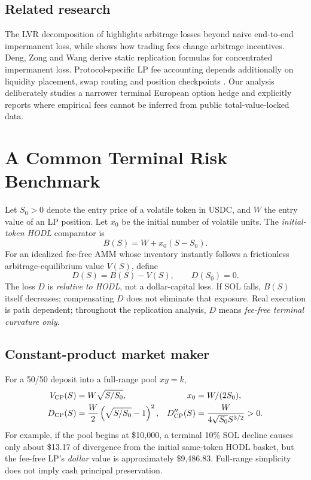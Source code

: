 \subsection{Related research}
The LVR decomposition of \cite{milionis2022lvr} highlights arbitrage losses beyond naive end-to-end impermanent loss, while \cite{milionis2023fees} shows how trading fees change arbitrage incentives. Deng, Zong and Wang \cite{deng2023static} derive static replication formulas for concentrated impermanent loss. Protocol-specific LP fee accounting depends additionally on liquidity placement, swap routing and position checkpoints \cite{univ3,meteoraaccounts}. Our analysis deliberately studies a narrower terminal European option hedge and explicitly reports where empirical fees cannot be inferred from public total-value-locked data.

\section{A Common Terminal Risk Benchmark}
Let $S_0>0$ denote the entry price of a volatile token in USDC, and $W$ the entry value of an LP position. Let $x_0$ be the initial number of volatile units. The \emph{initial-token HODL} comparator is
\begin{equation}
B(S)=W+x_0(S-S_0).
\label{eq:hodl}
\end{equation}
For an idealized fee-free AMM whose inventory instantly follows a frictionless arbitrage-equilibrium value $V(S)$, define
\begin{equation}
 D(S)=B(S)-V(S),\qquad D(S_0)=0.
 \label{eq:divergence}
\end{equation}
The loss $D$ is \emph{relative to HODL}, not a dollar-capital loss. If SOL falls, $B(S)$ itself decreases; compensating $D$ does not eliminate that exposure. Real execution is path dependent; throughout the replication analysis, $D$ means \emph{fee-free terminal curvature only}.

\subsection{Constant-product market maker}
For a 50/50 deposit into a full-range pool $xy=k$,
\begin{align}
V_{\mathrm{CP}}(S)&=W\sqrt{S/S_0},&
x_0&=W/(2S_0),\label{eq:cp-value}\\
D_{\mathrm{CP}}(S)&=\frac{W}{2}\left(\sqrt{S/S_0}-1\right)^2,&
D_{\mathrm{CP}}''(S)&=\frac{W}{4\sqrt{S_0}S^{3/2}}>0.
\label{eq:cp-loss}
\end{align}
For example, if the pool begins at \$10,000, a terminal 10\% SOL decline causes only about \$13.17 of divergence from the initial same-token HODL basket, but the fee-free LP's \emph{dollar} value is approximately \$9,486.83. Full-range simplicity does not imply cash principal preservation.

